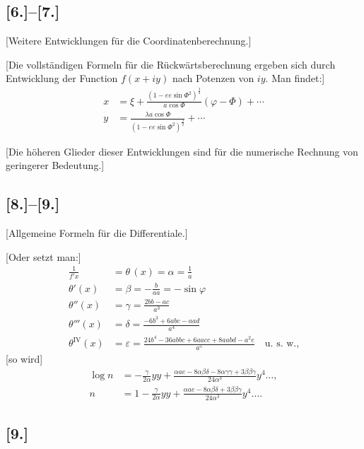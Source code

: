 \documentclass[12pt,a4paper]{article}
\begin{document}
\newpage
\subsection*{[6.]--[7.]}
\begin{center}
[Weitere Entwicklungen für die Coordinatenberechnung.]
\end{center}

[Die vollständigen Formeln für die Rückwärtsberechnung ergeben sich durch Entwicklung der Function $f(x+iy)$ nach Potenzen von $iy$. Man findet:]
\begin{align*}
x &= \xi + \frac{(1-ee\sin\Phi^2)^{\frac{3}{2}}}{a\cos\Phi}(\varphi-\Phi) + \cdots\\
y &= \frac{\lambda a\cos\Phi}{(1-ee\sin\Phi^2)^{\frac{3}{2}}} + \cdots
\end{align*}

[Die höheren Glieder dieser Entwicklungen sind für die numerische Rechnung von geringerer Bedeutung.]

\subsection*{[8.]--[9.]}
\begin{center}
[Allgemeine Formeln für die Differentiale.]
\end{center}

[Oder setzt man:]
\begin{align*}
\frac{1}{f'x} &= \theta\,(x) = \alpha = \frac{1}{a}\\
\theta'(x) &= \beta = -\frac{b}{aa} = -\sin\varphi\\
\theta''(x) &= \gamma = \frac{2bb-ac}{a^3}\\
\theta'''(x) &= \delta = \frac{-6b^3+6abc-aad}{a^4}\\
\theta^{\mathrm{IV}}(x) &= \varepsilon = \frac{24b^4-36abbc+6aacc+8aabd-a^2e}{a^5}\quad\text{u.~s.~w.,}
\end{align*}
[so wird]
\begin{align*}
\log n &= -\frac{\gamma}{2\alpha}yy + \frac{\alpha ae - 8\alpha\beta\delta - 8\alpha\gamma\gamma + 3\beta\beta\gamma}{24\alpha^3}y^4\ldots,\\
n &= 1 - \frac{\gamma}{2\alpha}yy + \frac{\alpha ae - 8\alpha\beta\delta + 3\beta\beta\gamma}{24\alpha^3}y^4\ldots.
\end{align*}

\subsection*{[9.]}
\end{document}
